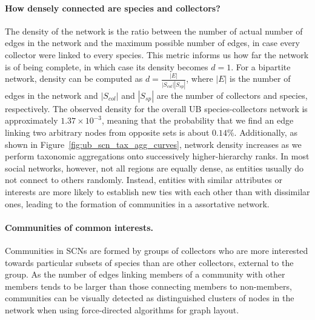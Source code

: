 \paragraph{How densely connected are species and collectors?}
The density of the network is the ratio between the number of actual number of edges in the network and the maximum possible number of edges, in case every collector were linked to every species. This metric informs us how far the network is of being complete, in which case its density becomes $d=1$. For a bipartite network, density can be computed as $d = \frac{|E|}{|S_{col}| |S_{sp}|}$, where $|E|$ is the number of edges in the network and $|S_{col}|$ and $|S_{sp}|$ are the number of collectors and species, respectively.
%
The observed density for the overall UB species-collectors network is approximately $1.37 \times 10^{-3}$, meaning that the probability that we find an edge linking two arbitrary nodes from opposite sets is about $0.14\%$. Additionally, as shown in Figure~\ref{fig:ub_scn_tax_agg_curves}, network density increases as we perform taxonomic aggregations onto successively higher-hierarchy ranks.
%
In most social networks, however, not all regions are equally dense, as entities usually do not connect to others randomly. Instead, entities with similar attributes or interests are more likely to establish new ties with each other than with dissimilar ones, leading to the formation of communities in a assortative network.


\paragraph{Communities of common interests.}
Communities in SCNs are formed by groups of collectors who are more interested towards particular subsets of species than are other collectors, external to the group.
As the number of edges linking members of a community with other members tends to be larger than those connecting members to non-members, communities can be visually detected as distinguished clusters of nodes in the network when using force-directed algorithms \cite{Jacomy2014} for graph layout.

